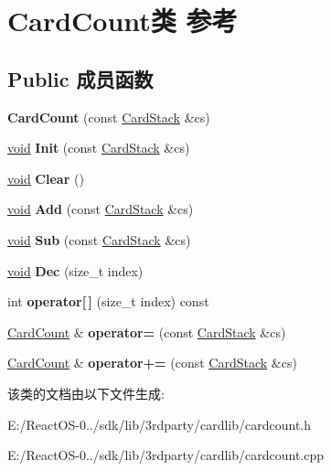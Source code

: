 \hypertarget{class_card_count}{}\section{Card\+Count类 参考}
\label{class_card_count}
\subsection*{Public 成员函数}
\begin{DoxyCompactItemize}
\item 
\mbox{\label{class_card_count_a3d26e1d3154b32553dce3ed20d02b2e8}} 
{\bfseries Card\+Count} (const \hyperlink{class_card_stack}{Card\+Stack} \&cs)
\item 
\mbox{\label{class_card_count_aef3fe2a0b5b49bc9cf28c6e434ef674d}} 
\hyperlink{interfacevoid}{void} {\bfseries Init} (const \hyperlink{class_card_stack}{Card\+Stack} \&cs)
\item 
\mbox{\label{class_card_count_a62e513c41079158e98ebb0a55312d590}} 
\hyperlink{interfacevoid}{void} {\bfseries Clear} ()
\item 
\mbox{\label{class_card_count_ac733f9f6e6fda40e9b786657702fe2c3}} 
\hyperlink{interfacevoid}{void} {\bfseries Add} (const \hyperlink{class_card_stack}{Card\+Stack} \&cs)
\item 
\mbox{\label{class_card_count_a39cd727bc3f77f8f5e481138ebffe035}} 
\hyperlink{interfacevoid}{void} {\bfseries Sub} (const \hyperlink{class_card_stack}{Card\+Stack} \&cs)
\item 
\mbox{\label{class_card_count_a1ba0d786f4e73d049779140d5f763ede}} 
\hyperlink{interfacevoid}{void} {\bfseries Dec} (size\+\_\+t index)
\item 
\mbox{\label{class_card_count_a7f988e160b898f3f29c6c4bf4ffad16c}} 
int {\bfseries operator\mbox{[}$\,$\mbox{]}} (size\+\_\+t index) const
\item 
\mbox{\label{class_card_count_af76fcf15dd0f8721c3bef33a9413051f}} 
\hyperlink{class_card_count}{Card\+Count} \& {\bfseries operator=} (const \hyperlink{class_card_stack}{Card\+Stack} \&cs)
\item 
\mbox{\label{class_card_count_ab1b3d1821cbe57a884ab497f753e2b8a}} 
\hyperlink{class_card_count}{Card\+Count} \& {\bfseries operator+=} (const \hyperlink{class_card_stack}{Card\+Stack} \&cs)
\end{DoxyCompactItemize}


该类的文档由以下文件生成\+:\begin{DoxyCompactItemize}
\item 
E\+:/\+React\+O\+S-\/0../sdk/lib/3rdparty/cardlib/cardcount.\+h\item 
E\+:/\+React\+O\+S-\/0../sdk/lib/3rdparty/cardlib/cardcount.\+cpp\end{DoxyCompactItemize}
